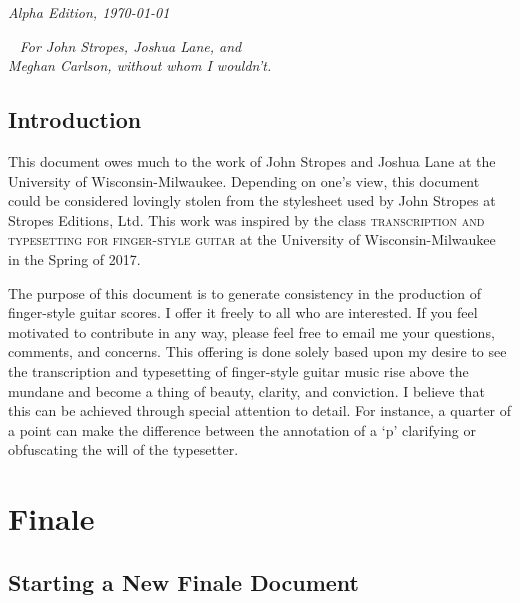 \documentclass[]{memoir}
\begin{document}
  \par\textit{Alpha Edition, \today}

  \clearpage

\tableofcontents



\listoftables

\clearpage
~\vfill
{\Huge \textit{For John Stropes, Joshua Lane, and}}\\

\vspace*{.15in}
{\Huge \textit{Meghan Carlson, without whom I wouldn't.}}
\vfill
\vfill

\clearpage
\pagestyle{ruled}
\nouppercaseheads

\chapter{Introduction}
This document owes much to the work of John Stropes and Joshua Lane at
the University of Wisconsin-Milwaukee. Depending on one's view, this
document could be considered lovingly stolen from the stylesheet used
by John Stropes at Stropes Editions, Ltd. This work was inspired by
the class \textsc{transcription and typesetting for finger-style
  guitar} at the University of Wisconsin-Milwaukee in the Spring of
2017.

The purpose of this document is to generate consistency in the
production of finger-style guitar scores. I offer it freely to all who
are interested. If you feel motivated to contribute in any way, please
feel free to email me your questions, comments, and concerns. This
offering is done solely based upon my desire to see the transcription
and typesetting of finger-style guitar music rise above the mundane
and become a thing of beauty, clarity, and conviction. I believe that
this can be achieved through special attention to detail. For
instance, a quarter of a point can make the difference between the
annotation of a `\textsf{p}' clarifying or obfuscating the will of the
typesetter.

\mainmatter

\part{Finale}
\chapter{Starting a New Finale Document}
\label{cha:start-new-docum}
\end{document}
